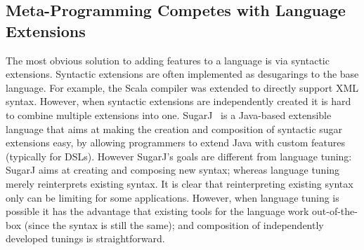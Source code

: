\begin{comment}
\subsection{Type-Directed Translations/Syntactic Sugar}
\marco{I'm tring to merge this and the next one}
Language extensions are often implemented as syntactic sugar of the base
language. For example, Scala compiler supports XML syntax in normal Scala code
directly (after Scala ?, users need to import \texttt{scala-xml} library
manually). However, this approach is hard in terms of implementation, because it
requires extending the compiler. Also, this approach does not support combining
multiple extensions into one.

SugarJ~\cite{erdweg11sugarj} is a Java-based extensible programming language
that allows programmers to extend the base language with custom language
features by definitions in meta-DSLs (SDF, Stratego, etc).
\yanlin{Is new syntax really a ``drawback''? I think for some system, like
  SugarJ, one of purpose IS to introduce these new syntax.}  Drawbacks: new
syntax. To create the extension, programmers have to work with multiple
languages (SDF, stratego, etc) while our approach works totally in Java
environment.

We can model certain types of language extensions with annotations
only, but those extensions do not introduce new syntax: they
merely do automatic code generation.
\end{comment}

\subsection{Meta-Programming Competes with Language Extensions}
The most obvious solution to adding features to a language is via syntactic
extensions. Syntactic extensions are often implemented as
desugarings to the base language. For example,
the Scala compiler was extended to directly support XML syntax.
However, when syntactic extensions are independently created it is hard
to combine multiple extensions into one.
SugarJ~\cite{erdweg11sugarj} is a Java-based extensible language that
aims at making the creation and composition of syntactic sugar
extensions easy, by allowing programmers to extend Java with custom
features (typically for DSLs). However SugarJ's goals are different
from language tuning: SugarJ aims at creating and composing new syntax;
whereas language tuning merely reinterprets existing syntax. It is
clear that reinterpreting existing syntax only can be limiting
for some applications. However, when language tuning is possible
it has the advantage that existing tools for the language work
out-of-the-box (since the syntax is still the same); and composition
of independently developed tunings is straightforward.

